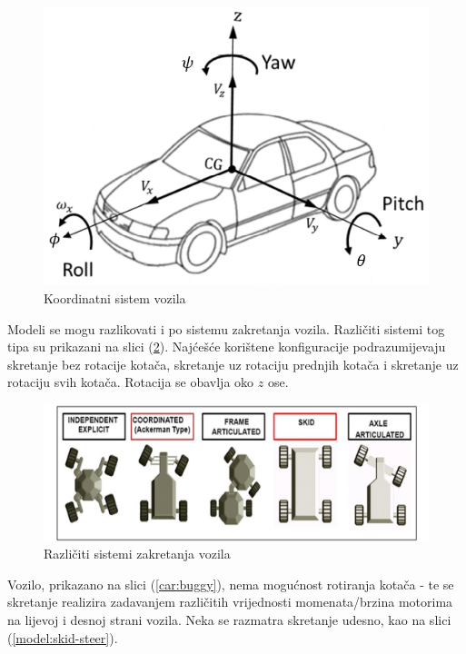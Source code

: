 \begin{figure}
\centering
\includegraphics[scale=0.5]{slike/model/coordinate-system.png}
\caption{Koordinatni sistem vozila \citep{kissai2019adaptive}}
\label{model:coordinate-system}
\end{figure}

Modeli se mogu razlikovati i po sistemu zakretanja vozila. Različiti sistemi tog tipa su prikazani na slici (\ref{model:steering-systems}). Najćešće korištene konfiguracije podrazumijevaju skretanje bez rotacije kotača, skretanje uz rotaciju prednjih kotača i skretanje uz rotaciju svih kotača. Rotacija se obavlja oko $z$ ose.

\begin{figure}
\centering
\includegraphics[width=\textwidth]{slike/model/steering-systems.jpg}
\caption{Različiti sistemi zakretanja vozila \citep{han2010development}}
\label{model:steering-systems}
\end{figure}

Vozilo, prikazano na slici (\ref{car:buggy}), nema mogućnost rotiranja kotača - te se skretanje realizira zadavanjem različitih vrijednosti momenata/brzina motorima na lijevoj i desnoj strani vozila. Neka se razmatra skretanje udesno, kao na slici (\ref{model:skid-steer}). 

